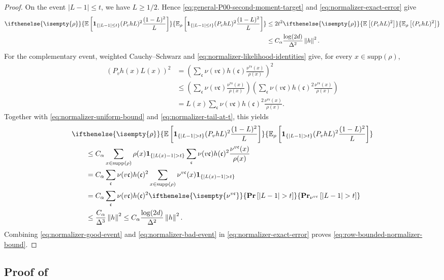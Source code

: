 \documentclass[a4paper,12pt]{article}
\theoremstyle{plain}
\theoremstyle{definition}
\def\*#1{\mathbf{#1}} %
\def\-#1{\mathrm{#1}} %
\def\!#1{\mathfrak{#1}} %
\def\*#1{\boldsymbol{#1}} %
\def\-#1{\mathrm{#1}} %
\def\!#1{\mathfrak{#1}} %
\def\oPr{\mathbf{Pr}}
\renewcommand{\Pr}[2][]{ \ifthenelse{\isempty{#1}}
  {\oPr\left[#2\right]}
  {\oPr_{#1}\left[#2\right]} } %
\def\oE{\mathbb{E}}
\newcommand{\E}[2][]{ \ifthenelse{\isempty{#1}}
  {\oE\left[#2\right]}
  {\oE_{#1}\left[#2\right]} }
\newcommand{\norm}[1]{\left\Vert#1\right\Vert}
\newcommand{\set}[1]{\left\{#1\right\}}
\newcommand{\tuple}[1]{\left(#1\right)}
\newcommand{\tp}{\tuple}
\newcommand{\abs}[1]{\left\vert#1\right\vert}
\begin{document}
\begin{proof}
On the event $\abs{L-1}\leq t$, we have $L\geq1/2$.  Hence
\eqref{eq:general-P00-second-moment-target} and
\eqref{eq:normalizer-exact-error} give
\begin{align}
  \E[\rho]{
    \*1_{\set{\abs{L-1}\leq t}}
    (P_vhL)^2\frac{(1-L)^2}{L}
  }
  &\leq
  2t^2\E[\rho]{(P_vhL)^2}
  \notag\\
  &\leq
  C_\alpha
  \frac{\log(2d)}{\Delta^2}\norm{h}^2.
  \label{eq:normalizer-good-event}
\end{align}
For the complementary event, weighted Cauchy--Schwarz and
\eqref{eq:normalizer-likelihood-identities} give, for every
$x\in\-{supp}(\rho)$,
\begin{align*}
  (P_vh(x)L(x))^2
  &=
  \tp{
    \sum_{\!c}\nu(v\!c)h(\!c)
    \frac{\nu^{v\!c}(x)}{\rho(x)}
  }^2
  \\
  &\leq
  \tp{
    \sum_{\!c}\nu(v\!c)
    \frac{\nu^{v\!c}(x)}{\rho(x)}
  }
  \tp{
    \sum_{\!c}\nu(v\!c)h(\!c)^2
    \frac{\nu^{v\!c}(x)}{\rho(x)}
  }
  \\
  &=
  L(x)
  \sum_{\!c}\nu(v\!c)h(\!c)^2
  \frac{\nu^{v\!c}(x)}{\rho(x)}.
\end{align*}
Together with \eqref{eq:normalizer-uniform-bound} and
\eqref{eq:normalizer-tail-at-t}, this yields
\begin{align}
  &\E[\rho]{
    \*1_{\set{\abs{L-1}>t}}
    (P_vhL)^2\frac{(1-L)^2}{L}
  }
  \notag\\
  &\qquad\leq
  C_\alpha
  \sum_{x\in\-{supp}(\rho)}
  \rho(x)\*1_{\set{\abs{L(x)-1}>t}}
  \sum_{\!c}\nu(v\!c)h(\!c)^2
  \frac{\nu^{v\!c}(x)}{\rho(x)}
  \notag\\
  &\qquad=
  C_\alpha
  \sum_{\!c}\nu(v\!c)h(\!c)^2
  \sum_{x\in\-{supp}(\rho)}
  \nu^{v\!c}(x)\*1_{\set{\abs{L(x)-1}>t}}
  \notag\\
  &\qquad=
  C_\alpha
  \sum_{\!c}\nu(v\!c)h(\!c)^2
  \Pr[\nu^{v\!c}]{\abs{L-1}>t}
  \notag\\
  &\qquad\leq
  \frac{C_\alpha}{\Delta^3}\norm{h}^2
  \leq
  C_\alpha\frac{\log(2d)}{\Delta^2}\norm{h}^2.
  \label{eq:normalizer-bad-event}
\end{align}
Combining \eqref{eq:normalizer-good-event} and
\eqref{eq:normalizer-bad-event} in
\eqref{eq:normalizer-exact-error} proves
\eqref{eq:row-bounded-normalizer-bound}.
\end{proof}



\subsection{Proof of }
\label{sec:master-form}
\end{document}
